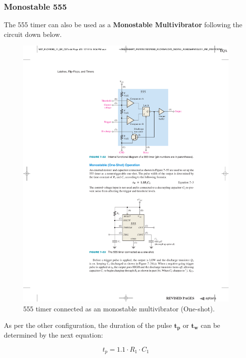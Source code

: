     
\subsubsection{Monostable 555}

The 555 timer can also be used as a \textbf{Monostable Multivibrator} following the circuit down below. 

\begin{figure}[H]
    \centering
    \includegraphics[scale = 1]{Graphics/VHDL/Practice 2/GRAPHICS/555/GRAPHS/MODES/MONOSTABLE.pdf}
    \caption{555 timer connected as an monostable multivibrator (One-shot). ~\autocite{FLOYD}}
    \label{fig:MONOSTABLE}
\end{figure}

As per the other configuration, the duration of the pulse $\mathbf{t_{p}}$ or $\mathbf{t_{w}}$ can be determined by the next equation:

\begin{equation*}
    t_{p} = 1.1 \cdot R_1 \cdot C_1
\end{equation*}

